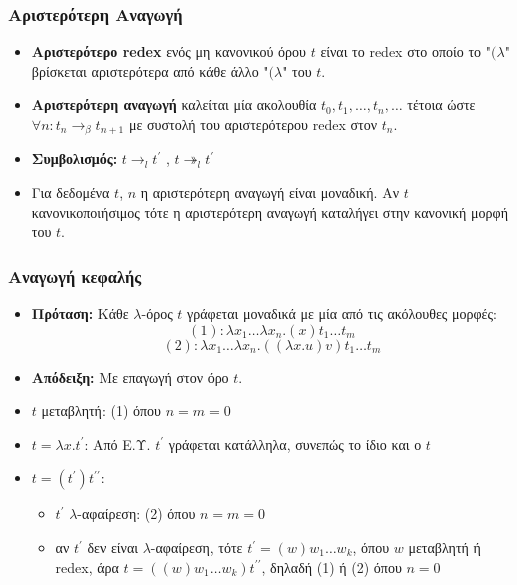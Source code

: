 \documentclass{beamer}
\begin{document}
\begin{frame}
\frametitle{Αριστερότερη Αναγωγή}
\begin{itemize}
\item \textbf{Αριστερότερο redex} ενός μη κανονικού όρου $t$ είναι το redex στο οποίο το "$(\lambda$" βρίσκεται αριστερότερα από κάθε άλλο "$(\lambda$" του $t$. \pause
\item \textbf{Αριστερότερη αναγωγή} καλείται μία ακολουθία $t_0, t_1, \ldots, t_n, \ldots$ τέτοια ώστε $\forall n: t_n \rightarrow _\beta t_{n+1}$ με συστολή του αριστερότερου redex στον $t_n$. \pause
\item \textbf{Συμβολισμός:} $t \rightarrow _l t^\prime$ , $t \twoheadrightarrow _l t^\prime$ \pause
\item Για δεδομένα $t$, $n$ η αριστερότερη αναγωγή είναι μοναδική. Αν $t$ κανονικοποιήσιμος τότε η αριστερότερη αναγωγή καταλήγει στην κανονική μορφή του $t$. \pause
\end{itemize}
\end{frame}

\begin{frame}
\frametitle{Αναγωγή κεφαλής}
\begin{itemize}
\item \textbf{Πρόταση:} Κάθε $\lambda$-όρος $t$ γράφεται μοναδικά με μία από τις ακόλουθες μορφές: \pause
 \[(1): \lambda x_1 \ldots \lambda x_n . (x) t_1 \ldots t_m\] 
 \[(2): \lambda x_1 \ldots \lambda x_n . ((\lambda x . u) v) t_1 \ldots t_m\] \pause
\item \textbf{Απόδειξη:} Με επαγωγή στον όρο $t$. \pause
\item $t$ μεταβλητή: (1) όπου $n=m=0$ \pause
\item $t = \lambda x . t^\prime$: Από Ε.Υ. $t^\prime$ γράφεται κατάλληλα, συνεπώς το ίδιο και ο $t$ \pause
\item $t = (t^\prime) t^{\prime \prime}$:
	\begin{itemize}
	\item $t^\prime$ $\lambda$-αφαίρεση: (2) όπου $n=m=0$ \pause
	\item αν $t^\prime$ δεν είναι $\lambda$-αφαίρεση, τότε $t^\prime = (w) w_1 \ldots w_k$, όπου $w$ μεταβλητή ή redex, άρα  $t = ((w) w_1 \ldots w_k) t^{\prime \prime}$, δηλαδή (1) ή (2) όπου $n=0$
	\end{itemize}
\end{itemize}
\end{frame}
\end{document}
